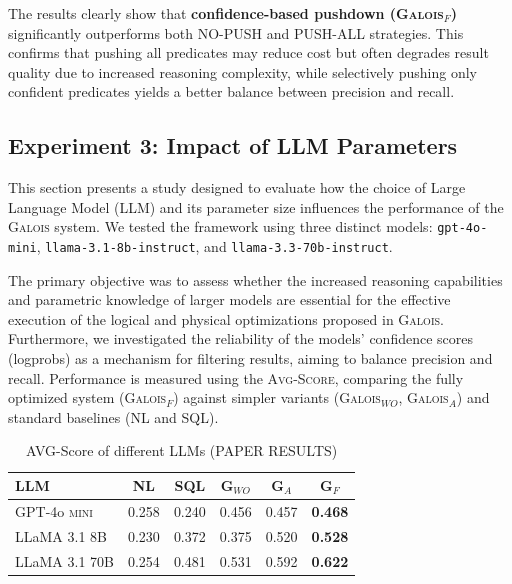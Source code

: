 The results clearly show that \textbf{confidence-based pushdown (\textsc{Galois}$_{F}$)} significantly outperforms both NO-PUSH and PUSH-ALL strategies. This confirms that pushing all predicates may reduce cost but often degrades result quality due to increased reasoning complexity, while selectively pushing only confident predicates yields a better balance between precision and recall.

\subsection{Experiment 3: Impact of LLM Parameters}

This section presents a study designed to evaluate how the choice of Large Language Model (LLM) and its parameter size influences the performance of the \textsc{Galois} system. We tested the framework using three distinct models: \texttt{gpt-4o-mini}, \texttt{llama-3.1-8b-instruct}, and \texttt{llama-3.3-70b-instruct}.

The primary objective was to assess whether the increased reasoning capabilities and parametric knowledge of larger models are essential for the effective execution of the logical and physical optimizations proposed in \textsc{Galois}. Furthermore, we investigated the reliability of the models' confidence scores (logprobs) as a mechanism for filtering results, aiming to balance precision and recall. Performance is measured using the \textsc{Avg-Score}, comparing the fully optimized system (\textsc{Galois}$_{F}$) against simpler variants (\textsc{Galois}$_{WO}$, \textsc{Galois}$_{A}$) and standard baselines (NL and SQL).

\begin{table}[H]
    \centering
    \caption{AVG-Score of different LLMs (PAPER RESULTS)}
    \begin{tabular}{lccccc}
        \toprule
        \textbf{LLM} & \textbf{NL} & \textbf{SQL} & \textbf{G$_{WO}$} & \textbf{G$_{A}$} & \textbf{G$_{F}$} \\
        \midrule
        GPT-4o \textsc{mini} & 0.258 & 0.240 & 0.456 & 0.457 & \textbf{0.468} \\
        LLaMA 3.1 8B & 0.230 & 0.372 & 0.375 & 0.520 & \textbf{0.528} \\
        LLaMA 3.1 70B & 0.254 & 0.481 & 0.531 & 0.592 & \textbf{0.622} \\
        \bottomrule
    \end{tabular}
\end{table}

